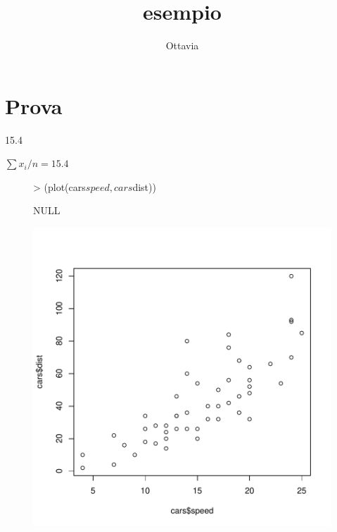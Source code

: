 \documentclass{article}
\begin{document}



\author{Ottavia}
\title{esempio}

\maketitle

\section{Prova}

\begin{Schunk}
\end{Schunk}

15.4

\verb*||

$\sum x_i / n = 15.4$


\begin{figure}
\begin{Schunk}
\begin{Sinput}
> (plot(cars$speed, cars$dist))
\end{Sinput}
\begin{Soutput}
NULL
\end{Soutput}
\end{Schunk}
\includegraphics{texProva-002}
\end{figure}
\end{document}
